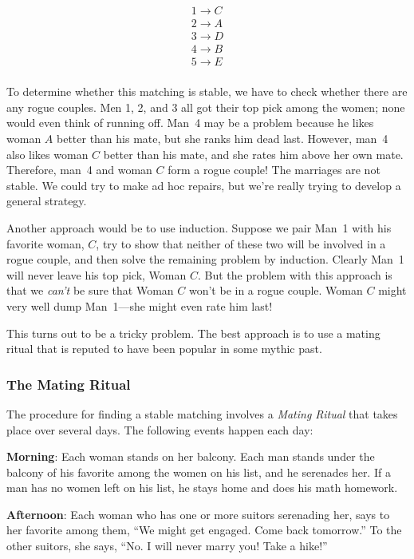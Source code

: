 \begin{eqnarray*}
1 \rightarrow C \\
2 \rightarrow A \\
3 \rightarrow D \\
4 \rightarrow B \\
5 \rightarrow E \\
\end{eqnarray*}

To determine whether this matching is stable, we have to check whether
there are any rogue couples.  Men 1, 2, and 3 all got their top pick
among the women; none would even think of running off.  Man~4 may be a
problem because he likes woman $A$ better than his mate, but she ranks him
dead last.  However, man~4 also likes woman $C$ better than his mate, and
she rates him above her own mate.  Therefore, man~4 and woman $C$ form a
rogue couple!  The marriages are not stable.  We could try to make ad hoc
repairs, but we're really trying to develop a general strategy.

Another approach would be to use induction.  Suppose we pair Man~1
with his favorite woman, $C$, try to show that neither of these two
will be involved in a rogue couple, and then solve the remaining
problem by induction.  Clearly Man~1 will never leave his top pick,
Woman $C$.  But the problem with this approach is that we \emph{can't}
be sure that Woman $C$ won't be in a rogue couple.  Woman $C$ might very
well dump Man~1---she might even rate him last!

This turns out to be a tricky problem.  The best approach is to use a
mating ritual that is reputed to have been popular in some mythic past.
\fi

\subsubsection{The Mating Ritual}

The procedure for finding a stable matching involves a \emph{Mating
Ritual} that takes place over several days.  The following events happen
each day:

\textbf{Morning}: Each woman stands on her balcony.  Each man stands
under the balcony of his favorite among the women on his list, and he
serenades her.  If a man has no women left on his list, he stays home
and does his math homework.

\textbf{Afternoon}: Each woman who has one or more suitors serenading
her, says to her favorite among them, ``We might get engaged.  Come
back tomorrow.''  To the other suitors, she says, ``No.  I will never
marry you!  Take a hike!''

